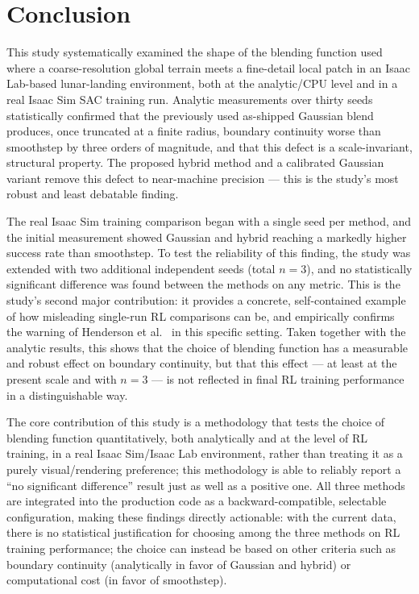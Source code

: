 \section{Conclusion}
\label{sec:sonuc}

This study systematically examined the shape of the blending function
used where a coarse-resolution global terrain meets a fine-detail local
patch in an Isaac Lab-based lunar-landing environment, both at the
analytic/CPU level and in a real Isaac Sim SAC training run. Analytic
measurements over thirty seeds statistically confirmed that the
previously used as-shipped Gaussian blend produces, once truncated at a
finite radius, boundary continuity worse than smoothstep by three
orders of magnitude, and that this defect is a scale-invariant,
structural property. The proposed hybrid method and a calibrated
Gaussian variant remove this defect to near-machine precision --- this
is the study's most robust and least debatable finding.

The real Isaac Sim training comparison began with a single seed per
method, and the initial measurement showed Gaussian and hybrid reaching
a markedly higher success rate than smoothstep. To test the reliability
of this finding, the study was extended with two additional independent
seeds (total $n=3$), and no statistically significant difference was
found between the methods on any metric. This is the study's second
major contribution: it provides a concrete, self-contained example of
how misleading single-run RL comparisons can be, and empirically
confirms the warning of Henderson et al.\ \citep{henderson2018deep} in
this specific setting. Taken together with the analytic results, this
shows that the choice of blending function has a measurable and robust
effect on boundary continuity, but that this effect --- at least at the
present scale and with $n=3$ --- is not reflected in final RL training
performance in a distinguishable way.

The core contribution of this study is a methodology that tests the
choice of blending function quantitatively, both analytically and at the
level of RL training, in a real Isaac Sim/Isaac Lab environment, rather
than treating it as a purely visual/rendering preference; this
methodology is able to reliably report a ``no significant difference''
result just as well as a positive one. All three methods are integrated
into the production code as a backward-compatible, selectable
configuration, making these findings directly actionable: with the
current data, there is no statistical justification for choosing among
the three methods on RL training performance; the choice can instead be
based on other criteria such as boundary continuity (analytically in
favor of Gaussian and hybrid) or computational cost (in favor of
smoothstep).

